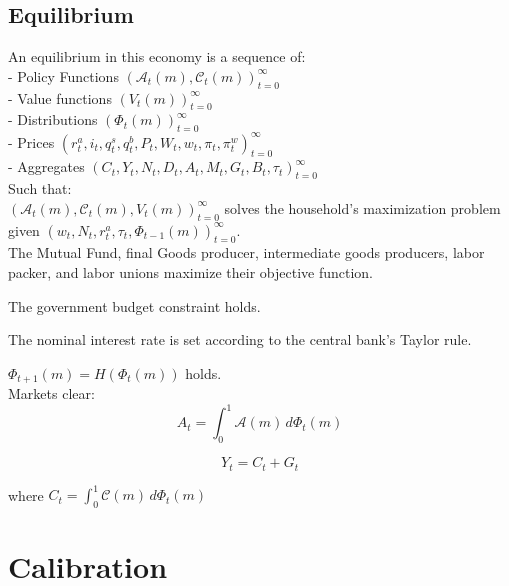 \documentclass[titlepage]{\econtex}\providecommand{\texname}{BufferStockTheory}
\begin{document}
\hypertarget{Equilibrium}{}
\subsection{Equilibrium}


An equilibrium in this economy is a sequence of: \\

- Policy Functions $\left( \mathcal{A}_{t}(m) , \mathcal{C}_{t}(m) \right )_{t=0}^{\infty}$ \\

- Value functions $ \left( V_{t}(m) \right)_{t=0}^{\infty}$\\

- Distributions $ \left(\Phi_{t}(m) \right)_{t=0}^{\infty}$\\

- Prices $ \left( r^{a}_{t}, i_{t}, q^{s}_{t}, q^{b}_{t}, P_{t}, W_{t} , w_{t} , \pi_{t}, \pi^{w}_{t} \right) _{t=0}^{\infty}$\\

- Aggregates $ \left(C_{t}, Y_{t} , N_{t},D_{t} , A_{t},M_{t},  G_{t} , B_{t}, \tau_{t} \right)_{t=0}^{\infty}$\\

Such that: \\

$ \left( \mathcal{A}_{t}(m) , \mathcal{C}_{t}(m), V_{t}(m)\right)_{t=0}^{\infty}$  solves the household's maximization problem given $  \left( w_{t}, N_{t},  r^{a}_{t}, \tau_{t}, \Phi_{t-1}(m)\right)_{t=0}^{\infty}$.\\

The Mutual Fund, final Goods producer, intermediate goods producers, labor packer, and labor unions maximize their objective function.

The government budget constraint holds.

The nominal interest rate is set according to the central bank's Taylor rule.


$ \Phi_{t+1}(m) = H(\Phi_{t}(m))$ holds.\\


Markets clear:\\

 $$ A_t = \int_{0}^{1} \mathcal{A}(m)\, d\Phi_{t}(m)$$
 
 $$ Y_t = C_{t} +G_{t} $$
 
 where $C_{t} = \int_{0}^{1} \mathcal{C}(m)\, d\Phi_{t}(m)$


\hypertarget{Calibration}{}
\section{Calibration}
\end{document}
